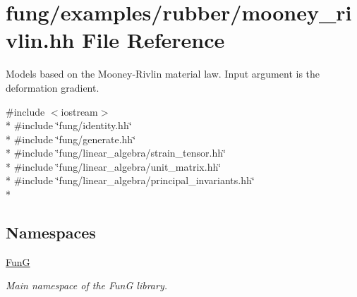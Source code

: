 \hypertarget{mooney__rivlin_8hh}{\section{fung/examples/rubber/mooney\-\_\-rivlin.hh File Reference}
\label{mooney__rivlin_8hh}
}


Models based on the Mooney-\/\-Rivlin material law. Input argument is the deformation gradient.  


{\ttfamily \#include $<$iostream$>$}\\*
{\ttfamily \#include \char`\"{}fung/identity.\-hh\char`\"{}}\\*
{\ttfamily \#include \char`\"{}fung/generate.\-hh\char`\"{}}\\*
{\ttfamily \#include \char`\"{}fung/linear\-\_\-algebra/strain\-\_\-tensor.\-hh\char`\"{}}\\*
{\ttfamily \#include \char`\"{}fung/linear\-\_\-algebra/unit\-\_\-matrix.\-hh\char`\"{}}\\*
{\ttfamily \#include \char`\"{}fung/linear\-\_\-algebra/principal\-\_\-invariants.\-hh\char`\"{}}\\*
\subsection*{Namespaces}
\begin{DoxyCompactItemize}
\item 
\hyperlink{namespaceFunG}{Fun\-G}
\begin{DoxyCompactList}\small\item\em Main namespace of the Fun\-G library. \end{DoxyCompactList}\end{DoxyCompactItemize}
